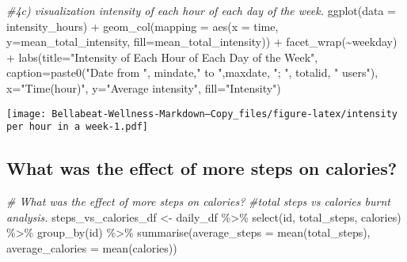 \documentclass[
]{article}
\newenvironment{Shaded}{\begin{snugshade}}{\end{snugshade}}
\newcommand{\AttributeTok}[1]{\textcolor[rgb]{0.77,0.63,0.00}{#1}}
\newcommand{\CommentTok}[1]{\textcolor[rgb]{0.56,0.35,0.01}{\textit{#1}}}
\newcommand{\FunctionTok}[1]{\textcolor[rgb]{0.00,0.00,0.00}{#1}}
\newcommand{\NormalTok}[1]{#1}
\newcommand{\OtherTok}[1]{\textcolor[rgb]{0.56,0.35,0.01}{#1}}
\newcommand{\SpecialCharTok}[1]{\textcolor[rgb]{0.00,0.00,0.00}{#1}}
\newcommand{\StringTok}[1]{\textcolor[rgb]{0.31,0.60,0.02}{#1}}
\begin{document}
\begin{Shaded}
\begin{Highlighting}[]
\CommentTok{\#4c) visualization intensity of each hour of each day of the week. }
\FunctionTok{ggplot}\NormalTok{(}\AttributeTok{data =}\NormalTok{ intensity\_hours) }\SpecialCharTok{+}
  \FunctionTok{geom\_col}\NormalTok{(}\AttributeTok{mapping =} \FunctionTok{aes}\NormalTok{(}\AttributeTok{x =}\NormalTok{ time, }\AttributeTok{y=}\NormalTok{mean\_total\_intensity, }
                         \AttributeTok{fill=}\NormalTok{mean\_total\_intensity)) }\SpecialCharTok{+}
  \FunctionTok{facet\_wrap}\NormalTok{(}\SpecialCharTok{\textasciitilde{}}\NormalTok{weekday) }\SpecialCharTok{+}
  \FunctionTok{labs}\NormalTok{(}\AttributeTok{title=}\StringTok{"Intensity of Each Hour of Each Day of the Week"}\NormalTok{,}
       \AttributeTok{caption=}\FunctionTok{paste0}\NormalTok{(}\StringTok{"Date from "}\NormalTok{, mindate,}\StringTok{" to "}\NormalTok{,maxdate, }\StringTok{"; "}\NormalTok{, }
\NormalTok{                      totalid, }\StringTok{" users"}\NormalTok{),}
       \AttributeTok{x=}\StringTok{"Time(hour)"}\NormalTok{,}
       \AttributeTok{y=}\StringTok{"Average intensity"}\NormalTok{,}
       \AttributeTok{fill=}\StringTok{"Intensity"}\NormalTok{)}
\end{Highlighting}
\end{Shaded}

\texttt{[image: Bellabeat-Wellness-Markdown---Copy\_files/figure-latex/intensity per hour in a week-1.pdf]}

\hypertarget{what-was-the-effect-of-more-steps-on-calories}{%
\subsection{What was the effect of more steps on
calories?}\label{what-was-the-effect-of-more-steps-on-calories}}

\begin{Shaded}
\begin{Highlighting}[]
\CommentTok{\# What was the effect of more steps on calories?}
\CommentTok{\#total steps vs calories burnt analysis. }
\NormalTok{steps\_vs\_calories\_df }\OtherTok{\textless{}{-}}\NormalTok{ daily\_df }\SpecialCharTok{\%\textgreater{}\%} 
  \FunctionTok{select}\NormalTok{(id, total\_steps, calories) }\SpecialCharTok{\%\textgreater{}\%} 
  \FunctionTok{group\_by}\NormalTok{(id) }\SpecialCharTok{\%\textgreater{}\%} 
  \FunctionTok{summarise}\NormalTok{(}\AttributeTok{average\_steps =} \FunctionTok{mean}\NormalTok{(total\_steps),}
            \AttributeTok{average\_calories =} \FunctionTok{mean}\NormalTok{(calories))}
\end{Highlighting}
\end{Shaded}
\end{document}
